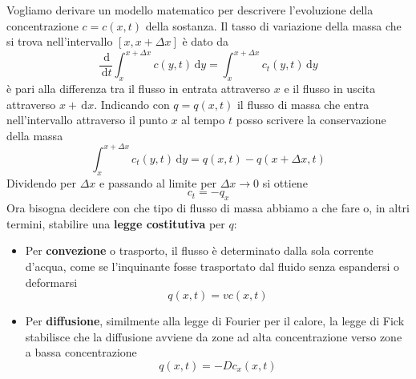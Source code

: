 \documentclass[10pt,a4paper,twoside,openright]{book}
\newcommand{\de}{\,\mathrm d}
\newcommand{\dx}{\de x}
\newcommand{\dy}{\de y}
\newcommand{\dt}{\de t}
\begin{document}
\begin{figure}[htpb]

\end{figure}
\FloatBarrier

Vogliamo derivare un modello matematico per descrivere l'evoluzione della concentrazione $\displaystyle c=c(x,t)$ della sostanza. Il tasso di variazione della massa che si trova nell'intervallo $\displaystyle [ x,x+\Delta x]$ è dato da
\begin{equation*}
\frac{\de}{\dt}\int ^{x+\Delta x}_{x} c(y,t) \dy=\int ^{x+\Delta x}_{x} c_{t}(y,t) \dy
\end{equation*}
è pari alla differenza tra il flusso in entrata attraverso $x$ e il flusso in uscita attraverso $x+\dx$. Indicando con $\displaystyle q=q(x,t)$ il flusso di massa che entra nell'intervallo attraverso il punto $x$ al tempo $t$ posso scrivere la conservazione della massa
\begin{equation*}
\int ^{x+\Delta x}_{x} c_{t}(y,t) \dy=q(x,t) -q(x+\Delta x,t)
\end{equation*}
Dividendo per $\displaystyle \Delta x$ e passando al limite per $\displaystyle \Delta x\rightarrow 0$ si ottiene
\begin{equation}
c_{t} =-q_{x}
\label{eq:inquinante-in-canale}
\end{equation}
Ora bisogna decidere con che tipo di flusso di massa abbiamo a che fare o, in altri termini, stabilire una \textbf{legge costitutiva }per $q$:
\begin{itemize}
\item Per \textbf{convezione} o trasporto, il flusso è determinato dalla sola corrente d'acqua, come se l'inquinante fosse trasportato dal fluido senza espandersi o deformarsi
\begin{equation*}
q(x,t) =vc(x,t)
\end{equation*}
\item Per \textbf{diffusione}, similmente alla legge di Fourier per il calore, la legge di Fick stabilisce che la diffusione avviene da zone ad alta concentrazione verso zone a bassa concentrazione
\begin{equation*}
q(x,t) =-Dc_{x}(x,t)
\end{equation*}
\end{itemize}
\end{document}
